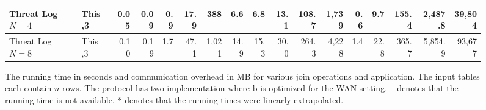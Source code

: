 \begin{figure*}[t!]
\begin{tabular}{|l |l|| r | r |r |r|r||r | r |r |r|r||r|r|r|r|r|}
	Threat Log $N=4$              & This                          \hfill ,3      & 0.05    & 0.09     & 0.9      & 17.9        &        388 &   6.6 & 6.8      & 13.1     & 108.7     &      1,739 &   0.6 &      9.7 &    155.4 &     2,487.8 &      39,804 \\ \hline
	Threat Log $N=8$              & This                          \hfill ,3      & 0.10    & 0.19     & 1.7      & 47.1        &      1,021 &  14.9 & 15.3     & 30.0     & 264.3     &      4,228 &   1.4 &     22.8 &    365.7 &     5,854.9 &      93,677 \\ \hline
\end{tabular}
\vspace{-0.3cm}
\caption{	\label{fig:compare}The running time in seconds and  communication overhead in MB for various join operations and application. The input tables each contain $n$ rows. The  \cite{PSWW18} protocol has two implementation where  \cite{PSWW18}b is optimized for the WAN setting. -- denotes that the running time is not available. * denotes that the running times were linearly extrapolated.}
\vspace{-0.2cm}
\end{figure*}



